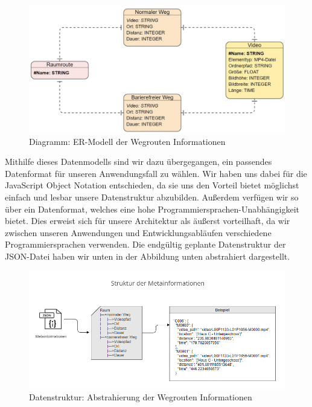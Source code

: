 \begin{figure}[H]
    \includegraphics[width=\textwidth]{Figures/3DNavigator/EntityrelationshipdiagrammRaumfinder.jpg}
    \caption{Diagramm: ER-Modell der Wegrouten Informationen}
    \label{fig:integration}
    \centering
\end{figure}

Mithilfe dieses Datenmodells sind wir dazu übergegangen, ein passendes Datenformat für unseren Anwendungsfall zu wählen. Wir haben uns dabei für die JavaScript Object Notation entschieden, da sie uns den Vorteil bietet möglichst einfach und lesbar unsere Datenstruktur abzubilden. Außerdem verfügen wir so über ein Datenformat, welches eine hohe Programmiersprachen-Unabhängigkeit bietet. Dies erweist sich für unsere Architektur als äußerst vorteilhaft, da wir zwischen unseren Anwendungen und Entwicklungsabläufen verschiedene Programmiersprachen verwenden. Die endgültig geplante Datenstruktur der JSON-Datei haben wir unten in der Abbildung unten abstrahiert dargestellt.

\begin{figure}[H]
    \includegraphics[width=\textwidth]{Figures/3DNavigator/Metadatenstruktur_Raumfinder.png}
    \caption{Datenstruktur: Abstrahierung der Wegrouten Informationen}
    \label{fig:integration}
    \centering
\end{figure}

